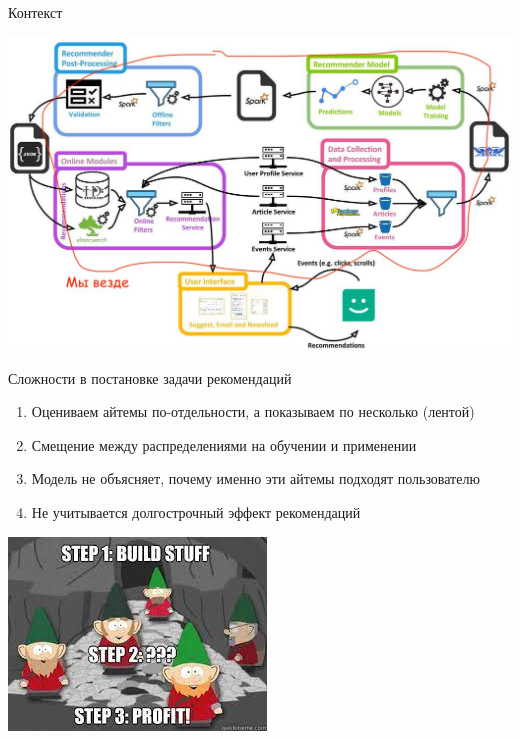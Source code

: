 \documentclass[11pt,aspectratio=169,handout]{beamer}
\author{Николай Анохин}
\title{Recommendations + Reinforcement Learning = \ensuremath\heartsuit}
\begin{document}
{

\begin{frame}
\titlepage
\end{frame}


}

\begin{frame}{Контекст}

\begin{center}
\includegraphics[scale=0.23]{images/mendeley.jpeg}
\end{center}

\end{frame}

\begin{frame}{Сложности в постановке задачи рекомендаций}

\begin{enumerate}
\item Оцениваем айтемы по-отдельности, а показываем по несколько (лентой)
\item Смещение между распределениями на обучении и применении
\item Модель не объясняет, почему именно эти айтемы подходят пользователю
\item {\color{blue} Не учитывается долгострочный эффект рекомендаций}
\end{enumerate}

\begin{center}
\includegraphics[scale=0.4]{images/profit.jpeg}
\end{center}

\end{frame}
\end{document}
